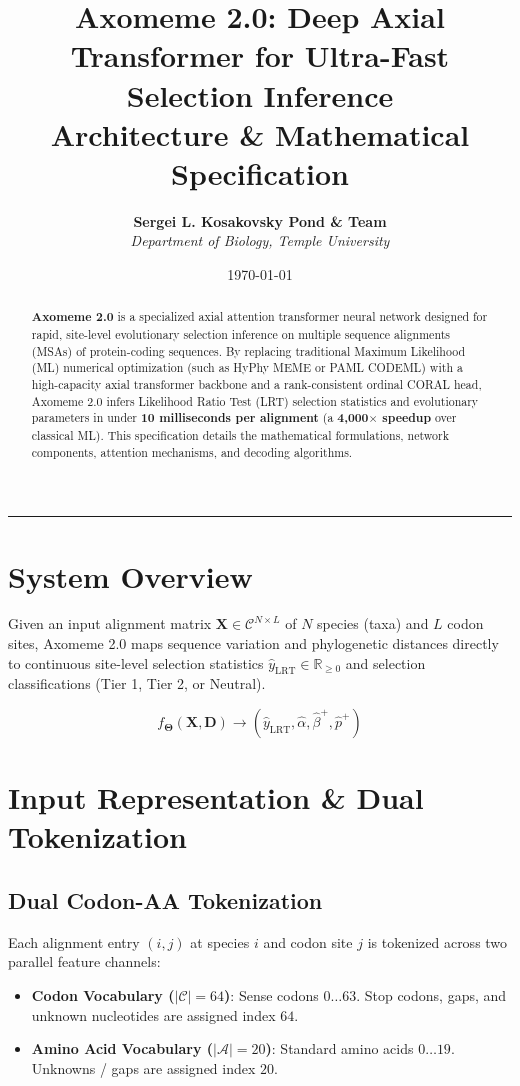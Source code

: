 \documentclass[11pt,a4paper]{article}
\title{\textbf{\Huge Axomeme 2.0: Deep Axial Transformer for Ultra-Fast Selection Inference}\\ \Large Architecture \& Mathematical Specification}
\author{\textbf{Sergei L. Kosakovsky Pond \& Team}\\ \textit{Department of Biology, Temple University}}
\date{\today}
\begin{document}
\maketitle

\begin{abstract}
\noindent \textbf{Axomeme 2.0} is a specialized axial attention transformer neural network designed for rapid, site-level evolutionary selection inference on multiple sequence alignments (MSAs) of protein-coding sequences. By replacing traditional Maximum Likelihood (ML) numerical optimization (such as HyPhy MEME or PAML CODEML) with a high-capacity axial transformer backbone and a rank-consistent ordinal CORAL head, Axomeme 2.0 infers Likelihood Ratio Test (LRT) selection statistics and evolutionary parameters in under \textbf{10 milliseconds per alignment} (a \textbf{4,000$\times$ speedup} over classical ML). This specification details the mathematical formulations, network components, attention mechanisms, and decoding algorithms.
\end{abstract}

\vspace{1em}\hrule\vspace{1em}

\section{System Overview}

Given an input alignment matrix $\mathbf{X} \in \mathcal{C}^{N \times L}$ of $N$ species (taxa) and $L$ codon sites, Axomeme 2.0 maps sequence variation and phylogenetic distances directly to continuous site-level selection statistics $\hat{y}_{\text{LRT}} \in \mathbb{R}_{\ge 0}$ and selection classifications (Tier 1, Tier 2, or Neutral).

\begin{equation}
f_{\mathbf{\Theta}}(\mathbf{X}, \mathbf{D}) \longrightarrow \left( \hat{y}_{\text{LRT}}, \hat{\alpha}, \hat{\beta}^+, \hat{p}^+ \right)
\end{equation}

\section{Input Representation \& Dual Tokenization}

\subsection{Dual Codon-AA Tokenization}
Each alignment entry $(i, j)$ at species $i$ and codon site $j$ is tokenized across two parallel feature channels:
\begin{itemize}
    \item \textbf{Codon Vocabulary ($|\mathcal{C}| = 64$)}: Sense codons $0 \dots 63$. Stop codons, gaps, and unknown nucleotides are assigned index $64$.
    \item \textbf{Amino Acid Vocabulary ($|\mathcal{A}| = 20$)}: Standard amino acids $0 \dots 19$. Unknowns / gaps are assigned index $20$.
\end{itemize}
\end{document}
